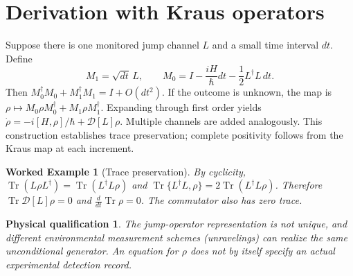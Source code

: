 \documentclass[11pt,a4paper]{article}
\newtheorem{example}{Worked Example}\newtheorem{remark}{Physical qualification}
\newcommand{\tr}{\operatorname{Tr}}\newcommand{\D}{\mathcal D}\newcommand{\kb}{k_{\mathrm B}}\newcommand{\E}{\mathbb E}\newcommand{\Ha}{\mathcal H}\newcommand{\ket}[1]{|#1\rangle}\newcommand{\bra}[1]{\langle#1|}
\begin{document}
\section{Derivation with Kraus operators}
Suppose there is one monitored jump channel $L$ and a small time interval $dt$. Define
\begin{equation}
M_1=\sqrt{dt}\,L,\qquad M_0=I-\frac{iH}{\hbar}dt-\frac12 L^\dagger L\,dt.
\end{equation}
Then $M_0^\dagger M_0+M_1^\dagger M_1=I+O(dt^2)$. If the outcome is unknown, the map is $\rho\mapsto M_0\rho M_0^\dagger+M_1\rho M_1^\dagger$. Expanding through first order yields $\dot\rho=-i[H,\rho]/\hbar+\D[L]\rho$. Multiple channels are added analogously. This construction establishes trace preservation; complete positivity follows from the Kraus map at each increment.
\begin{example}[Trace preservation]
By cyclicity, $\tr(L\rho L^\dagger)=\tr(L^\dagger L\rho)$ and $\tr\{L^\dagger L,\rho\}=2\tr(L^\dagger L\rho)$. Therefore $\tr\D[L]\rho=0$ and $\frac{d}{dt}\tr\rho=0$. The commutator also has zero trace.
\end{example}
\begin{remark}
The jump-operator representation is not unique, and different environmental measurement schemes (unravelings) can realize the same unconditional generator. An equation for $\rho$ does not by itself specify an actual experimental detection record.
\end{remark}
\end{document}
